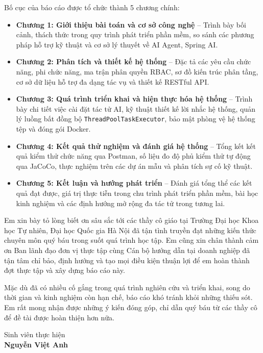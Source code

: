 \documentclass[12pt,a4paper]{report}
\begin{document}
Bố cục của báo cáo được tổ chức thành 5 chương chính:
\begin{itemize}
    \item \textbf{Chương 1: Giới thiệu bài toán và cơ sở công nghệ} -- Trình bày bối cảnh, thách thức trong quy trình phát triển phần mềm, so sánh các phương pháp hỗ trợ kỹ thuật và cơ sở lý thuyết về AI Agent, Spring AI.
    \item \textbf{Chương 2: Phân tích và thiết kế hệ thống} -- Đặc tả các yêu cầu chức năng, phi chức năng, ma trận phân quyền RBAC, sơ đồ kiến trúc phân tầng, cơ sở dữ liệu hỗ trợ đa dạng tác vụ và thiết kế RESTful API.
    \item \textbf{Chương 3: Quá trình triển khai và hiện thực hóa hệ thống} -- Trình bày chi tiết việc cài đặt tác tử AI, kỹ thuật thiết kế lời nhắc hệ thống, quản lý luồng bất đồng bộ \texttt{ThreadPoolTaskExecutor}, bảo mật phòng vệ hệ thống tệp và đóng gói Docker.
    \item \textbf{Chương 4: Kết quả thử nghiệm và đánh giá hệ thống} -- Tổng kết kết quả kiểm thử chức năng qua Postman, số liệu đo độ phủ kiểm thử tự động qua JaCoCo, thực nghiệm trên các dự án mẫu và phân tích sự cố kỹ thuật.
    \item \textbf{Chương 5: Kết luận và hướng phát triển} -- Đánh giá tổng thể các kết quả đạt được, giá trị thực tiễn trong chu trình phát triển phần mềm, bài học kinh nghiệm và các định hướng mở rộng đa tác tử trong tương lai.
\end{itemize}

Em xin bày tỏ lòng biết ơn sâu sắc tới các thầy cô giáo tại Trường Đại học Khoa học Tự nhiên, Đại học Quốc gia Hà Nội đã tận tình truyền đạt những kiến thức chuyên môn quý báu trong suốt quá trình học tập. Em cũng xin chân thành cảm ơn Ban lãnh đạo đơn vị thực tập cùng Cán bộ hướng dẫn tại doanh nghiệp đã tận tâm chỉ bảo, định hướng và tạo mọi điều kiện thuận lợi để em hoàn thành đợt thực tập và xây dựng báo cáo này.

Mặc dù đã có nhiều cố gắng trong quá trình nghiên cứu và triển khai, song do thời gian và kinh nghiệm còn hạn chế, báo cáo khó tránh khỏi những thiếu sót. Em rất mong nhận được những ý kiến đóng góp, chỉ dẫn quý báu từ các thầy cô để đề tài được hoàn thiện hơn nữa.

\vspace{1cm}
\begin{flushright}
Sinh viên thực hiện \\
\textbf{Nguyễn Việt Anh}
\end{flushright}
\newpage
\end{document}
